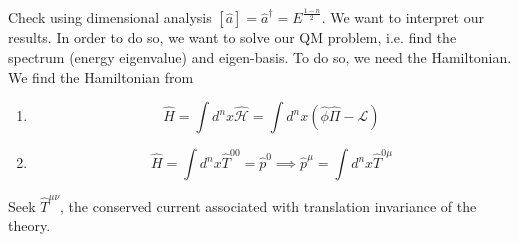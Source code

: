 Check using dimensional analysis $[\hat{a}] = \hat{a}^\dagger = E^{\frac{1-n}{2}}$. We want to interpret our results. In order to do so, we want to solve our QM problem, i.e. find the spectrum (energy eigenvalue) and eigen-basis. To do so, we need the Hamiltonian. We find the Hamiltonian from
 \begin{enumerate}
     \item 
     \begin{equation}
         \hat{H} = \int d^n x \hat{\mathcal{H}} = \int d^n x (\hat{\phi} \hat{\Pi} - \mathcal{L})
     \end{equation}
     \item $$\hat{H} = \int d^n x \hat{T}^{00} = \hat{p}^0  \implies \hat{p}^\mu = \int d^n x \hat{T}^{0\mu}$$
 \end{enumerate}

Seek $\hat{T}^{\mu \nu}$, the conserved current associated with translation invariance of the theory.

